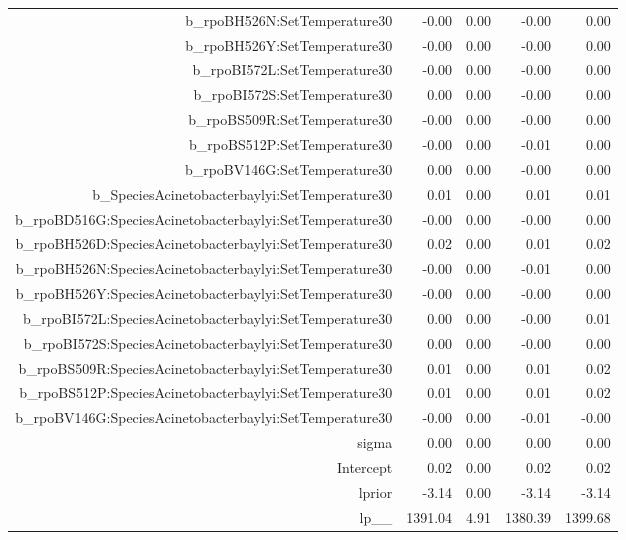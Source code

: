 \begin{table}[ht]
\begin{tabular}{rrrrr}
  b\_rpoBH526N:SetTemperature30 & -0.00 & 0.00 & -0.00 & 0.00 \\ 
  b\_rpoBH526Y:SetTemperature30 & -0.00 & 0.00 & -0.00 & 0.00 \\ 
  b\_rpoBI572L:SetTemperature30 & -0.00 & 0.00 & -0.00 & 0.00 \\ 
  b\_rpoBI572S:SetTemperature30 & 0.00 & 0.00 & -0.00 & 0.00 \\ 
  b\_rpoBS509R:SetTemperature30 & -0.00 & 0.00 & -0.00 & 0.00 \\ 
  b\_rpoBS512P:SetTemperature30 & -0.00 & 0.00 & -0.01 & 0.00 \\ 
  b\_rpoBV146G:SetTemperature30 & 0.00 & 0.00 & -0.00 & 0.00 \\ 
  b\_SpeciesAcinetobacterbaylyi:SetTemperature30 & 0.01 & 0.00 & 0.01 & 0.01 \\ 
  b\_rpoBD516G:SpeciesAcinetobacterbaylyi:SetTemperature30 & -0.00 & 0.00 & -0.00 & 0.00 \\ 
  b\_rpoBH526D:SpeciesAcinetobacterbaylyi:SetTemperature30 & 0.02 & 0.00 & 0.01 & 0.02 \\ 
  b\_rpoBH526N:SpeciesAcinetobacterbaylyi:SetTemperature30 & -0.00 & 0.00 & -0.01 & 0.00 \\ 
  b\_rpoBH526Y:SpeciesAcinetobacterbaylyi:SetTemperature30 & -0.00 & 0.00 & -0.00 & 0.00 \\ 
  b\_rpoBI572L:SpeciesAcinetobacterbaylyi:SetTemperature30 & 0.00 & 0.00 & -0.00 & 0.01 \\ 
  b\_rpoBI572S:SpeciesAcinetobacterbaylyi:SetTemperature30 & 0.00 & 0.00 & -0.00 & 0.00 \\ 
  b\_rpoBS509R:SpeciesAcinetobacterbaylyi:SetTemperature30 & 0.01 & 0.00 & 0.01 & 0.02 \\ 
  b\_rpoBS512P:SpeciesAcinetobacterbaylyi:SetTemperature30 & 0.01 & 0.00 & 0.01 & 0.02 \\ 
  b\_rpoBV146G:SpeciesAcinetobacterbaylyi:SetTemperature30 & -0.00 & 0.00 & -0.01 & -0.00 \\ 
  sigma & 0.00 & 0.00 & 0.00 & 0.00 \\ 
  Intercept & 0.02 & 0.00 & 0.02 & 0.02 \\ 
  lprior & -3.14 & 0.00 & -3.14 & -3.14 \\ 
  lp\_\_ & 1391.04 & 4.91 & 1380.39 & 1399.68 \\ 
   \hline
\end{tabular}
\end{table}
